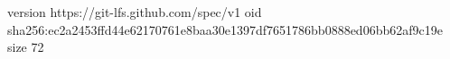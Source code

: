 version https://git-lfs.github.com/spec/v1
oid sha256:ec2a2453ffd44e62170761e8baa30e1397df7651786bb0888ed06bb62af9c19e
size 72
